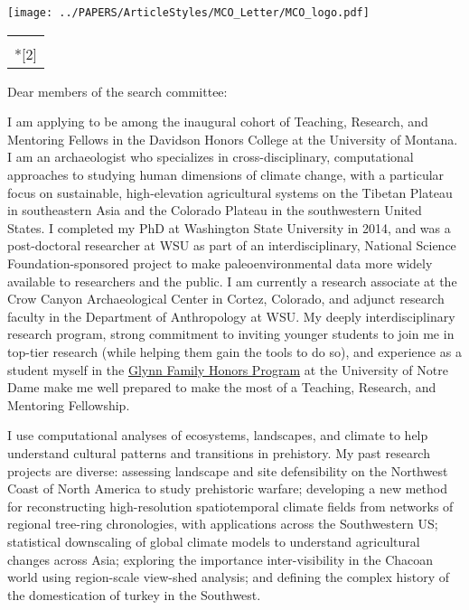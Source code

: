 \documentclass[letterpaper,11pt]{letter}
\makeatletter
\renewcommand*{\opening}[1]{\ifx\@empty\fromaddress 
  \thispagestyle{firstpage}%
  \else  %
    \thispagestyle{empty}%
    {\raggedleft\begin{tabular}{l@{}}\ignorespaces 
      \fromaddress \\*[2\parskip]%
      \end{tabular}\par}%
  \fi 
  {\raggedright\@date\par}%
  \vspace{2\parskip}%
  #1\par\nobreak}
\makeatother
\begin{document}

\begin{letter}{}

\texttt{[image: ../PAPERS/ArticleStyles/MCO\_Letter/MCO\_logo.pdf]}

\vspace{-1.1in}

\opening{Dear members of the search committee:}

I am applying to be among the inaugural cohort of Teaching, Research, and Mentoring Fellows in the Davidson Honors College at the University of Montana. I am an archaeologist who specializes in cross-disciplinary, computational approaches to studying human dimensions of climate change, with a particular focus on sustainable, high-elevation agricultural systems on the Tibetan Plateau in southeastern Asia and the Colorado Plateau in the southwestern United States. I completed my PhD at Washington State University in 2014, and was a post-doctoral researcher at WSU as part of an interdisciplinary, National Science Foundation-sponsored project to make paleoenvironmental data more widely available to researchers and the public. I am currently a research associate at the Crow Canyon Archaeological Center in Cortez, Colorado, and adjunct research faculty in the Department of Anthropology at WSU. My deeply interdisciplinary research program, strong commitment to inviting younger students to join me in top-tier research (while helping them gain the tools to do so), and experience as a student myself in the \href{http://glynnhonors.nd.edu/}{Glynn Family Honors Program} at the University of Notre Dame make me well prepared to make the most of a Teaching, Research, and Mentoring Fellowship.

I use computational analyses of ecosystems, landscapes, and climate to help understand cultural patterns and transitions in prehistory\cite{Bocinsky2014_diss,DAlpoimGuedes2016_PNAS}. My past research projects are diverse: assessing landscape and site defensibility on the Northwest Coast of North America to study prehistoric warfare\cite{Bocinsky2014}; developing a new method for reconstructing high-resolution spatiotemporal climate fields from networks of regional tree-ring chronologies, with applications across the Southwestern US\cite{Bocinsky2014_NatComm, Schwindt2016, Bocinsky2016_SA}; statistical downscaling of global climate models to understand agricultural changes across Asia\cite{DAlpoimGuedes2015, DAlpoimGuedes2015_PLoSONE, DAlpoimGuedes2016_CA}; exploring the importance inter-visibility in the Chacoan world using region-scale view-shed analysis\cite{VanDyke2016}; and defining the complex history of the domestication of turkey in the Southwest\cite{Bocinsky2016_USC, Lipe2016}.


\end{letter}
\end{document}
